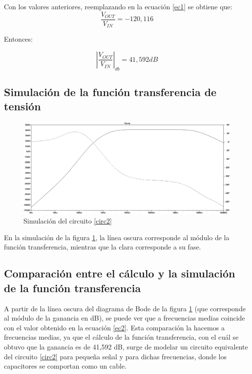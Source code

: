 Con los valores anteriores, reemplazando en la ecuaci\'on \ref{ec1} se obtiene que:
$$ \frac{V_{OUT}}{V_{IN}} = -120,116 $$

Entonces:

\begin{equation} |\frac{V_{OUT}}{V_{IN}} |_{db} = 41,592 dB \label{ec2} \end{equation}

\subsection*{\color{orange} Simulaci\'on de la funci\'on transferencia de tensi\'on}


\begin{figure}[H] %
\centering
\includegraphics[scale=0.45]{../EJ2/rtaenfrec}
\caption{Simulaci\'on del circuito \ref{circ2}}
\label{simEj2}
\end{figure}

En la simulaci\'on de la figura \ref{simEj2}, la l\'inea oscura corresponde al m\'odulo de la funci\'on transferencia, mientras que la clara corresponde a su fase. 

\subsection*{\color{orange} Comparaci\'on entre el c\'alculo y la simulaci\'on de la funci\'on transferencia}

A partir de la l\'inea oscura del diagrama de Bode de la figura \ref{simEj2} (que corresponde al m\'odulo de la ganancia en dB), se puede ver que a frecuencias medias coincide con  el valor obtenido en la ecuaci\'on \ref{ec2}. Esta comparaci\'on la hacemos a frecuencias medias, ya que el c\'alculo de la funci\'on transferencia, con el cu\'al se obtuvo que la ganancia es de 41,592 dB, surge de modelar un circuito equivalente del circuito \ref{circ2} para pequeña señal y para dichas frecuencias, donde los capacitores se comportan como un cable.




















